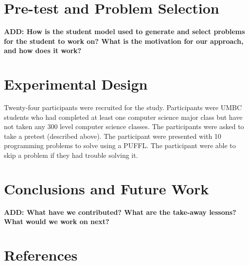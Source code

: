 \documentclass[twocolumn]{article}
\newcommand{\fix}[1]{{\bf #1}}
\begin{document}
\section{Pre-test and Problem Selection}
\label{sec:prob-selection}

\fix{ADD: How is the student model used to generate and select
  problems for the student to work on?  What is the motivation for our
  approach, and how does it work?}

\section{Experimental Design}
\label{sec:exper-design}
 
Twenty-four participants were recruited for the study. Participants were UMBC students who had completed at least one computer science major class but have not taken any 300 level computer science classes.
The participants were asked to take a pretest (described above). The participant were presented with 10 programming problems to solve using a PUFFL. The participant  were able to skip a problem if they had trouble solving it.


\section{Conclusions and Future Work}
\label{conclusions}

\fix{ADD:  What have we contributed?  What are the take-away lessons?
  What would we work on next?}
  
\section*{References}
\end{document}
